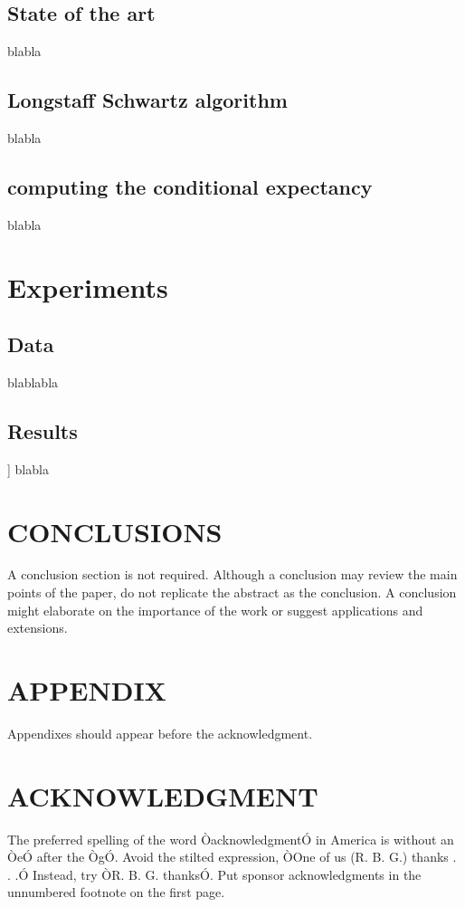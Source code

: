 \documentclass[12pt]{article}
\begin{document}
	\subsection{State of the art}
	blabla
	\subsection{Longstaff Schwartz algorithm}
	blabla
	\subsection{computing the conditional expectancy}
	blabla
	
	\section{Experiments}
	
	\subsection{Data}
	
	blablabla
	
	\subsection{Results}]
	blabla
	\section{CONCLUSIONS}
	
	A conclusion section is not required. Although a conclusion may review the main points of the paper, do not replicate the abstract as the conclusion. A conclusion might elaborate on the importance of the work or suggest applications and extensions. 
	
	\addtolength{\textheight}{-12cm}  
	
	
	\section*{APPENDIX}
	
	Appendixes should appear before the acknowledgment.
	
	\section*{ACKNOWLEDGMENT}
	
	The preferred spelling of the word ÒacknowledgmentÓ in America is without an ÒeÓ after the ÒgÓ. Avoid the stilted expression, ÒOne of us (R. B. G.) thanks . . .Ó  Instead, try ÒR. B. G. thanksÓ. Put sponsor acknowledgments in the unnumbered footnote on the first page.
	
\end{document}
